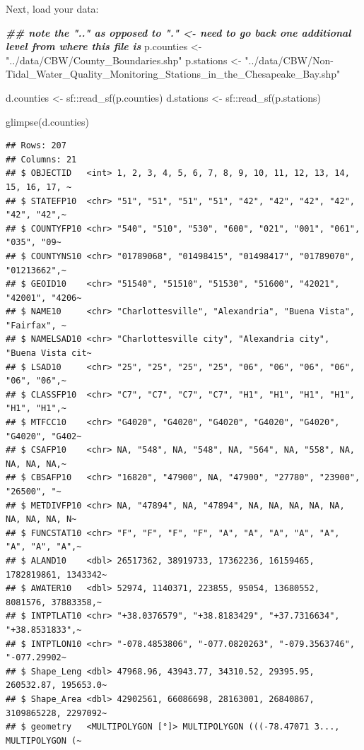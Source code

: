 \documentclass[]{article}
\newenvironment{Shaded}{\begin{snugshade}}{\end{snugshade}}
\newcommand{\DocumentationTok}[1]{\textcolor[rgb]{0.56,0.35,0.01}{\textbf{\textit{#1}}}}
\newcommand{\FunctionTok}[1]{\textcolor[rgb]{0.00,0.00,0.00}{#1}}
\newcommand{\NormalTok}[1]{#1}
\newcommand{\OtherTok}[1]{\textcolor[rgb]{0.56,0.35,0.01}{#1}}
\newcommand{\SpecialCharTok}[1]{\textcolor[rgb]{0.00,0.00,0.00}{#1}}
\newcommand{\StringTok}[1]{\textcolor[rgb]{0.31,0.60,0.02}{#1}}
\begin{document}
Next, load your data:

\begin{Shaded}
\begin{Highlighting}[]
\DocumentationTok{\#\# note the ".." as opposed to "." \textless{}{-} need to go back one additional level from where this file is}
\NormalTok{p.counties }\OtherTok{\textless{}{-}} \StringTok{"../data/CBW/County\_Boundaries.shp"}
\NormalTok{p.stations }\OtherTok{\textless{}{-}} \StringTok{"../data/CBW/Non{-}Tidal\_Water\_Quality\_Monitoring\_Stations\_in\_the\_Chesapeake\_Bay.shp"}


\NormalTok{d.counties }\OtherTok{\textless{}{-}}\NormalTok{ sf}\SpecialCharTok{::}\FunctionTok{read\_sf}\NormalTok{(p.counties)}
\NormalTok{d.stations }\OtherTok{\textless{}{-}}\NormalTok{ sf}\SpecialCharTok{::}\FunctionTok{read\_sf}\NormalTok{(p.stations)}

\FunctionTok{glimpse}\NormalTok{(d.counties)}
\end{Highlighting}
\end{Shaded}

\begin{verbatim}
## Rows: 207
## Columns: 21
## $ OBJECTID   <int> 1, 2, 3, 4, 5, 6, 7, 8, 9, 10, 11, 12, 13, 14, 15, 16, 17, ~
## $ STATEFP10  <chr> "51", "51", "51", "51", "42", "42", "42", "42", "42", "42",~
## $ COUNTYFP10 <chr> "540", "510", "530", "600", "021", "001", "061", "035", "09~
## $ COUNTYNS10 <chr> "01789068", "01498415", "01498417", "01789070", "01213662",~
## $ GEOID10    <chr> "51540", "51510", "51530", "51600", "42021", "42001", "4206~
## $ NAME10     <chr> "Charlottesville", "Alexandria", "Buena Vista", "Fairfax", ~
## $ NAMELSAD10 <chr> "Charlottesville city", "Alexandria city", "Buena Vista cit~
## $ LSAD10     <chr> "25", "25", "25", "25", "06", "06", "06", "06", "06", "06",~
## $ CLASSFP10  <chr> "C7", "C7", "C7", "C7", "H1", "H1", "H1", "H1", "H1", "H1",~
## $ MTFCC10    <chr> "G4020", "G4020", "G4020", "G4020", "G4020", "G4020", "G402~
## $ CSAFP10    <chr> NA, "548", NA, "548", NA, "564", NA, "558", NA, NA, NA, NA,~
## $ CBSAFP10   <chr> "16820", "47900", NA, "47900", "27780", "23900", "26500", "~
## $ METDIVFP10 <chr> NA, "47894", NA, "47894", NA, NA, NA, NA, NA, NA, NA, NA, N~
## $ FUNCSTAT10 <chr> "F", "F", "F", "F", "A", "A", "A", "A", "A", "A", "A", "A",~
## $ ALAND10    <dbl> 26517362, 38919733, 17362236, 16159465, 1782819861, 1343342~
## $ AWATER10   <dbl> 52974, 1140371, 223855, 95054, 13680552, 8081576, 37883358,~
## $ INTPTLAT10 <chr> "+38.0376579", "+38.8183429", "+37.7316634", "+38.8531833",~
## $ INTPTLON10 <chr> "-078.4853806", "-077.0820263", "-079.3563746", "-077.29902~
## $ Shape_Leng <dbl> 47968.96, 43943.77, 34310.52, 29395.95, 260532.87, 195653.0~
## $ Shape_Area <dbl> 42902561, 66086698, 28163001, 26840867, 3109865228, 2297092~
## $ geometry   <MULTIPOLYGON [°]> MULTIPOLYGON (((-78.47071 3..., MULTIPOLYGON (~
\end{verbatim}
\end{document}
